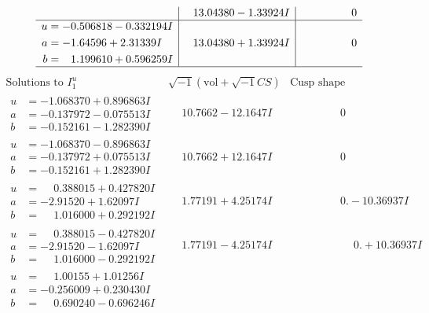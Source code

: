 \documentclass[1p]{elsarticle_modified}
\theoremstyle{definition}
\newcommand{\I}{\sqrt{-1}}
\begin{document}
$$\begin{array}{c|c|c}
 & \phantom{-}13.04380 - 1.33924 I & \phantom{-0.000000 } 0 \\ \hline\begin{aligned}
u &= -0.506818 - 0.332194 I \\
a &= -1.64596 + 2.31339 I \\
b &= \phantom{-}1.199610 + 0.596259 I\end{aligned}
 & \phantom{-}13.04380 + 1.33924 I & \phantom{-0.000000 } 0\\
 \hline 
 \end{array}$$\newpage$$\begin{array}{c|c|c}  
\text{Solutions to }I^u_{1}& \I (\text{vol} + \sqrt{-1}CS) & \text{Cusp shape}\\
 \hline 
\begin{aligned}
u &= -1.068370 + 0.896863 I \\
a &= -0.137972 - 0.075513 I \\
b &= -0.152161 - 1.282390 I\end{aligned}
 & \phantom{-}10.7662 - 12.1647 I & \phantom{-0.000000 } 0 \\ \hline\begin{aligned}
u &= -1.068370 - 0.896863 I \\
a &= -0.137972 + 0.075513 I \\
b &= -0.152161 + 1.282390 I\end{aligned}
 & \phantom{-}10.7662 + 12.1647 I & \phantom{-0.000000 } 0 \\ \hline\begin{aligned}
u &= \phantom{-}0.388015 + 0.427820 I \\
a &= -2.91520 + 1.62097 I \\
b &= \phantom{-}1.016000 + 0.292192 I\end{aligned}
 & \phantom{-}1.77191 + 4.25174 I & \phantom{-0.000000 } 0. - 10.36937 I \\ \hline\begin{aligned}
u &= \phantom{-}0.388015 - 0.427820 I \\
a &= -2.91520 - 1.62097 I \\
b &= \phantom{-}1.016000 - 0.292192 I\end{aligned}
 & \phantom{-}1.77191 - 4.25174 I & \phantom{-0.000000 -}0. + 10.36937 I \\ \hline\begin{aligned}
u &= \phantom{-}1.00155 + 1.01256 I \\
a &= -0.256009 + 0.230430 I \\
b &= \phantom{-}0.690240 - 0.696246 I\end{aligned}

\end{array}$$
\end{document}
